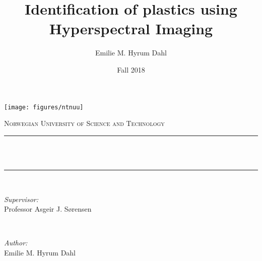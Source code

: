 \documentclass{report}
\title{Identification of plastics using Hyperspectral Imaging}								%
\author{Emilie M. Hyrum Dahl}								%
\date{Fall 2018}											%
\makeatletter
\let\thetitle\@title
\makeatother
\begin{document}
\begin{titlepage}
	\centering
    \vspace*{0.5 cm}
    \texttt{[image: figures/ntnuu]}\\[1.0 cm]	%
    \begin{centering}
    \textsc{\LARGE Norwegian University of \newline\newline Science and Technology}\\[1.0 cm]	%
    \end{centering}
	\rule{\linewidth}{0.3 mm} \\[0.4 cm]
	{ \huge \bfseries \thetitle}\\
	\rule{\linewidth}{0.3 mm} \\[1.3 cm]
	
	\begin{minipage}{0.4\textwidth}
		\begin{flushleft} \large
			\emph{Supervisor:}\\
			Professor Asgeir J. S{\o}rensen
			\end{flushleft}
			\end{minipage}~
			\begin{minipage}{0.4\textwidth}
            
			\begin{flushright} \large
			\emph{Author:} \\
	    	Emilie M. Hyrum Dahl
		\end{flushright}
        
	\end{minipage}\\[2 cm]
	
\end{titlepage}


% 
%




\tableofcontents

\hypersetup{pageanchor=true}

\listoffigures
\begin{comment}
\nomenclature[P]{$c$}{Speed of light in a vacuum inertial system}
\nomenclature[P]{$h$}{Plank Constant}
\nomenclature[P]{$g$}{Gravitational Constant}
\nomenclature[N]{$\mathbb{R}$}{Real Numbers}
\nomenclature[N]{$\mathbb{C}$}{Complex Numbers}
\nomenclature[N]{$\mathbb{H}$}{Quaternions}
\nomenclature[O]{$V$}{Constant Volume}
\nomenclature[O]{$\rho$}{Friction Index}
 
\printnomenclature

\end{comment} 
\end{document}
